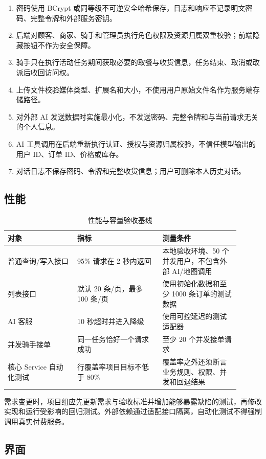 \begin{enumerate}
  \item 密码使用 BCrypt 或同等级不可逆安全哈希保存，日志和响应不记录明文密码、完整令牌和外部服务密钥。
  \item 后端对顾客、商家、骑手和管理员执行角色权限及资源归属双重校验；前端隐藏按钮不作为安全保障。
  \item 骑手只在执行活动任务期间获取必要的取餐与收货信息，任务结束、取消或改派后收回访问权。
  \item 上传文件校验媒体类型、扩展名和大小，不使用用户原始文件名作为服务端存储路径。
  \item 对外部 AI 发送数据时实施最小化，不发送密码、完整令牌和与当前请求无关的个人信息。
  \item AI 工具调用在后端重新执行认证、授权与资源归属校验，不信任模型输出的用户 ID、订单 ID、价格或库存。
  \item 对话日志不保存密码、令牌和完整收货信息；用户可删除本人历史对话。
\end{enumerate}

\subsection{性能}

\begin{longtable}{|L{0.27\linewidth}|L{0.33\linewidth}|L{0.30\linewidth}|}
\caption{性能与容量验收基线}\label{tab:performance}\\ \hline
\textbf{对象} & \textbf{指标} & \textbf{测量条件} \\ \hline
普通查询/写入接口 & 95\% 请求在 2 秒内返回 & 本地验收环境、50 个并发用户，不包含外部 AI/地图调用 \\ \hline
列表接口 & 默认 20 条/页，最多 100 条/页 & 使用初始化数据和至少 1000 条订单的测试数据 \\ \hline
AI 客服 & 10 秒超时并进入降级 & 使用可控延迟的测试适配器 \\ \hline
并发骑手接单 & 同一任务恰好一个请求成功 & 至少 20 个并发接单请求 \\ \hline
核心 Service 自动化测试 & 行覆盖率项目目标不低于 80\% & 覆盖率之外还须断言业务规则、权限、并发和回退结果 \\ \hline
\end{longtable}

需求变更时，项目组应先更新需求与验收标准并增加能够暴露缺陷的测试，再修改实现和运行受影响的回归测试。外部依赖通过适配接口隔离，自动化测试不得强制调用真实付费服务。

\subsection{界面}

